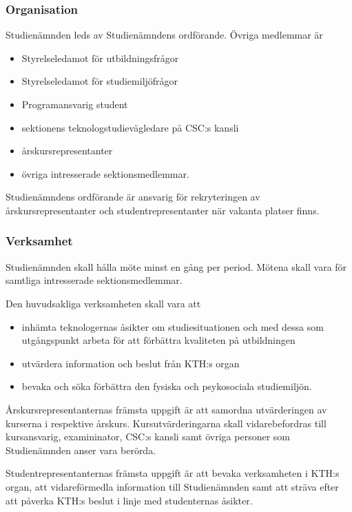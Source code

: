 \documentclass[a4paper,12pt]{article}
\begin{document}
\subsubsection{Organisation}

Studienämnden leds av Studienämndens ordförande. Övriga medlemmar är

\begin{itemize}
  \item Styrelseledamot för utbildningsfrågor
  \item Styrelseledamot för studiemiljöfrågor
  \item Programansvarig student
  \item sektionens teknologstudievägledare på CSC:s kansli
  \item årskursrepresentanter
  \item övriga intresserade sektionsmedlemmar.
\end{itemize}

Studienämndens ordförande är ansvarig för rekryteringen av årskursrepresentanter och studentrepresentanter när vakanta platser finns.

\subsubsection{Verksamhet}

Studienämnden skall hålla möte minst en gång per period. Mötena skall vara för samtliga intresserade sektionsmedlemmar.

Den huvudsakliga verksamheten skall vara att

\begin{itemize}
  \item inhämta teknologernas åsikter om studiesituationen och med dessa som utgångspunkt arbeta för att förbättra kvaliteten på utbildningen
  \item utvärdera information och beslut från KTH:s organ
  \item bevaka och söka förbättra den fysiska och psykosociala studiemiljön.
\end{itemize}

Årskursrepresentanternas främsta uppgift är att samordna utvärderingen av kurserna i respektive årskurs. Kursutvärderingarna skall vidarebefordras till kursansvarig, examininator, CSC:s kansli samt övriga personer som Studienämnden anser vara berörda.

Studentrepresentanternas främsta uppgift är att bevaka verksamheten i KTH:s organ, att vidareförmedla information till Studienämnden samt att sträva efter att påverka KTH:s beslut i linje med studenternas åsikter.
\end{document}
